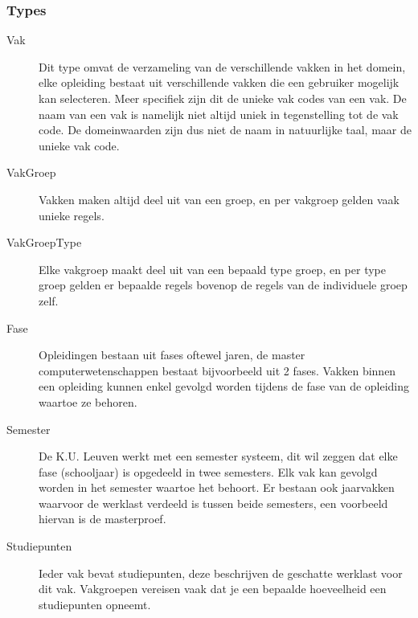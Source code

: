 \subsubsection{Types}
\begin{description}
\item [Vak] Dit type omvat de verzameling van de verschillende vakken in het domein, elke opleiding bestaat uit verschillende vakken die een gebruiker mogelijk kan selecteren. Meer specifiek zijn dit de unieke vak codes van een vak. De naam van een vak is namelijk niet altijd uniek in tegenstelling tot de vak code. De domeinwaarden zijn dus niet de naam in natuurlijke taal, maar de unieke vak code.
\item [VakGroep] Vakken maken altijd deel uit van een groep, en per vakgroep gelden vaak unieke regels. 
\item [VakGroepType] Elke vakgroep maakt deel uit van een bepaald type groep, en per type groep gelden er bepaalde regels bovenop de regels van de individuele groep zelf.
\item [Fase] Opleidingen bestaan uit fases oftewel jaren, de master computerwetenschappen bestaat bijvoorbeeld uit 2 fases. Vakken binnen een opleiding kunnen enkel gevolgd worden tijdens de fase van de opleiding waartoe ze behoren. 
\item [Semester] De K.U. Leuven werkt met een semester systeem, dit wil zeggen dat elke fase (schooljaar) is opgedeeld in twee semesters. Elk vak kan gevolgd worden in het semester waartoe het behoort. Er bestaan ook jaarvakken waarvoor de werklast verdeeld is tussen beide semesters, een voorbeeld hiervan is de masterproef.
\item [Studiepunten] Ieder vak bevat studiepunten, deze beschrijven de geschatte werklast voor dit vak. Vakgroepen vereisen vaak dat je een bepaalde hoeveelheid een studiepunten opneemt. 
\end{description}


